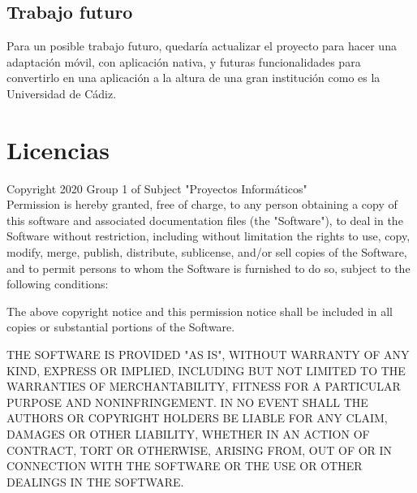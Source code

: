 \documentclass[12pt,letterpaper]{report}
\begin{document}
	\subsection{Trabajo futuro}
		Para un posible trabajo futuro, quedaría actualizar el proyecto para hacer una adaptación móvil,
		con aplicación nativa, y futuras funcionalidades para convertirlo en una aplicación a la altura
		de una gran institución como es la Universidad de Cádiz.

\section{Licencias}
Copyright 2020 Group 1 of Subject "Proyectos Informáticos"
\\
Permission is hereby granted, free of charge, to any person obtaining a copy of this software and associated documentation files (the "Software"), to deal in the Software without restriction, including without limitation the rights to use, copy, modify, merge, publish, distribute, sublicense, and/or sell copies of the Software, and to permit persons to whom the Software is furnished to do so, subject to the following conditions:

The above copyright notice and this permission notice shall be included in all copies or substantial portions of the Software.

THE SOFTWARE IS PROVIDED "AS IS", WITHOUT WARRANTY OF ANY KIND, EXPRESS OR IMPLIED, INCLUDING BUT NOT LIMITED TO THE WARRANTIES OF MERCHANTABILITY, FITNESS FOR A PARTICULAR PURPOSE AND NONINFRINGEMENT. IN NO EVENT SHALL THE AUTHORS OR COPYRIGHT HOLDERS BE LIABLE FOR ANY CLAIM, DAMAGES OR OTHER LIABILITY, WHETHER IN AN ACTION OF CONTRACT, TORT OR OTHERWISE, ARISING FROM, OUT OF OR IN CONNECTION WITH THE SOFTWARE OR THE USE OR OTHER DEALINGS IN THE SOFTWARE.
\end{document}
